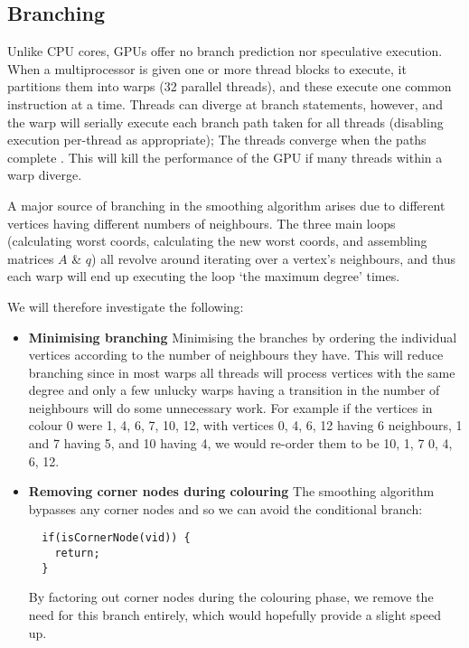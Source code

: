 \subsection{Branching}\label{sec:branching}
Unlike CPU cores, GPUs offer no branch prediction nor speculative execution.
When a multiprocessor is given one or more thread blocks to execute, it partitions them into warps (32 parallel threads), and these execute one common instruction at a time.
Threads can diverge at branch statements, however, and the warp will serially execute each branch path taken for all threads (disabling execution per-thread as appropriate); The threads converge when the paths complete \cite{cuda_guide}. This will kill the performance of the GPU if many threads within a warp diverge.

A major source of branching in the smoothing algorithm arises due to different vertices having different numbers of neighbours. The three main loops (calculating worst coords, calculating the new worst coords, and assembling matrices $A$ \& $q$) all revolve around iterating over a vertex's neighbours, and thus each warp will end up executing the loop `the maximum degree' times.

We will therefore investigate the following:
\begin{itemize}
  \item \textbf{Minimising branching}
                Minimising the branches by ordering the individual vertices according to the number of neighbours they have. This will reduce branching since in most warps all threads will process vertices with the same degree and only a few unlucky warps having a transition in the number of neighbours will do some unnecessary work.
                For example if the vertices in colour 0 were 1, 4, 6, 7, 10, 12, with vertices 0, 4, 6, 12 having 6 neighbours, 1 and 7 having 5, and 10 having 4, we would re-order them to be 10, 1, 7 0, 4, 6, 12.

  \item \textbf{Removing corner nodes during colouring}
                The smoothing algorithm bypasses any corner nodes and so we can avoid the conditional branch:
                \begin{verbatim}
  if(isCornerNode(vid)) {
    return;
  }
                \end{verbatim}
                By factoring out corner nodes during the colouring phase, we remove the need for this branch entirely, which would hopefully provide a slight speed up.
\end{itemize}
